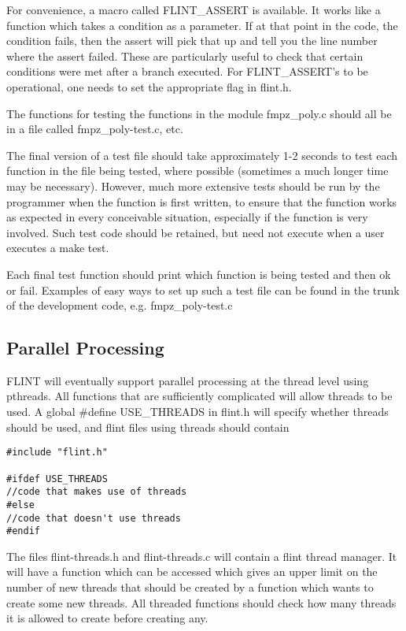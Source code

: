 \documentclass[a4paper,10pt]{article}
\begin{document}
For convenience, a macro called FLINT\_ASSERT is available. It works like a function which takes a condition as a parameter. If at that point in the code, the condition fails, then the assert will pick that up and tell you the line number where the assert failed. These are particularly useful to check that certain conditions were met after a branch executed. For FLINT\_ASSERT's to be operational, one needs to set the appropriate flag in flint.h.

The functions for testing the functions in the module fmpz\_poly.c should all be in a file called fmpz_poly-test.c, etc.

The final version of a test file should take approximately 1-2 seconds to test each function in the file being tested, where possible (sometimes a much longer time may be necessary). However, much more extensive tests should be run by the programmer when the function is first written, to ensure that the function works as expected in every conceivable situation, especially if the function is very involved. Such test code should be retained, but need not execute when a user executes a make test.

Each final test function should print which function is being tested and then ok or fail. Examples of easy ways to set up such a test file can be found in the trunk of the development code, e.g. fmpz\_poly-test.c 

\subsection{Parallel Processing}
FLINT will eventually support parallel processing at the thread level using pthreads. All functions that are sufficiently complicated will allow threads to be used. A global \#define USE\_THREADS in flint.h will specify whether threads should be used, and flint files using threads should contain 

\begin{verbatim}#include "flint.h"

#ifdef USE_THREADS
//code that makes use of threads
#else
//code that doesn't use threads
#endif\end{verbatim}

The files flint-threads.h and flint-threads.c will contain a flint thread manager. It will have a function which can be accessed which gives an upper limit on the number of new threads that should be created by a function which wants to create some new threads. All threaded functions should check how many threads it is allowed to create before creating any.
\end{document}
